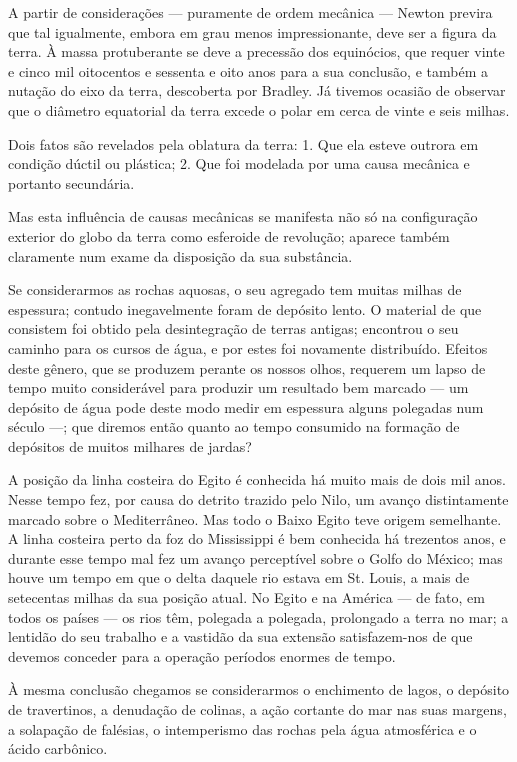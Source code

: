 \documentclass[11pt,a5paper,twoside,openany]{book}
\begin{document}
A partir de considerações — puramente de ordem mecânica — Newton previra que tal igualmente, embora em grau menos impressionante, deve ser a figura da terra. À massa protuberante se deve a precessão dos equinócios, que requer vinte e cinco mil oitocentos e sessenta e oito anos para a sua conclusão, e também a nutação do eixo da terra, descoberta por Bradley. Já tivemos ocasião de observar que o diâmetro equatorial da terra excede o polar em cerca de vinte e seis milhas.

Dois fatos são revelados pela oblatura da terra: 1. Que ela esteve outrora em condição dúctil ou plástica; 2. Que foi modelada por uma causa mecânica e portanto secundária.

Mas esta influência de causas mecânicas se manifesta não só na configuração exterior do globo da terra como esferoide de revolução; aparece também claramente num exame da disposição da sua substância.

Se considerarmos as rochas aquosas, o seu agregado tem muitas milhas de espessura; contudo inegavelmente foram de depósito lento. O material de que consistem foi obtido pela desintegração de terras antigas; encontrou o seu caminho para os cursos de água, e por estes foi novamente distribuído. Efeitos deste gênero, que se produzem perante os nossos olhos, requerem um lapso de tempo muito considerável para produzir um resultado bem marcado — um depósito de água pode deste modo medir em espessura alguns polegadas num século —; que diremos então quanto ao tempo consumido na formação de depósitos de muitos milhares de jardas?

A posição da linha costeira do Egito é conhecida há muito mais de dois mil anos. Nesse tempo fez, por causa do detrito trazido pelo Nilo, um avanço distintamente marcado sobre o Mediterrâneo. Mas todo o Baixo Egito teve origem semelhante. A linha costeira perto da foz do Mississippi é bem conhecida há trezentos anos, e durante esse tempo mal fez um avanço perceptível sobre o Golfo do México; mas houve um tempo em que o delta daquele rio estava em St. Louis, a mais de setecentas milhas da sua posição atual. No Egito e na América — de fato, em todos os países — os rios têm, polegada a polegada, prolongado a terra no mar; a lentidão do seu trabalho e a vastidão da sua extensão satisfazem-nos de que devemos conceder para a operação períodos enormes de tempo.

À mesma conclusão chegamos se considerarmos o enchimento de lagos, o depósito de travertinos, a denudação de colinas, a ação cortante do mar nas suas margens, a solapação de falésias, o intemperismo das rochas pela água atmosférica e o ácido carbônico.
\end{document}
